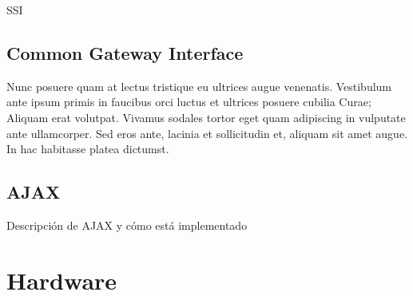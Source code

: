 SSI

\subsection{Common Gateway Interface}

Nunc posuere quam at lectus tristique eu ultrices augue venenatis. Vestibulum ante ipsum primis in faucibus orci luctus et ultrices posuere cubilia Curae; Aliquam erat volutpat. Vivamus sodales tortor eget quam adipiscing in vulputate ante ullamcorper. Sed eros ante, lacinia et sollicitudin et, aliquam sit amet augue. In hac habitasse platea dictumst.


\subsection{AJAX}

Descripción de AJAX y cómo está implementado


\section{Hardware}

